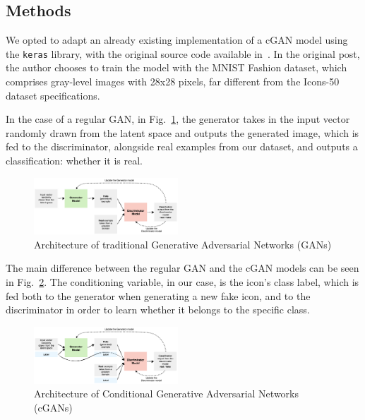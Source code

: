 \subsection{Methods}\label{subsec:methods}
We opted to adapt an already existing implementation of a cGAN model using the \texttt{keras} library, with the original source code available in~\cite{BrownleeCGAN, BrownleeGAN}.
In the original post, the author chooses to train the model with the MNIST Fashion dataset, which comprises gray-level images with 28x28 pixels, far different from the Icons-50 dataset specifications.

In the case of a regular GAN, in Fig.~\ref{fig:GANArch}, the generator takes in the input vector randomly drawn from the latent space and outputs the generated image, which is fed to the discriminator, alongside real examples from our dataset, and outputs a classification: whether it is real.

\begin{figure}[htbp]
    \centering
    \includegraphics[width=0.48\textwidth]{images/architecture/gan_arch}
    \caption{Architecture of traditional Generative Adversarial Networks (GANs)}
    \label{fig:GANArch}
\end{figure}

The main difference between the regular GAN and the cGAN models can be seen in Fig.~\ref{fig:cGANArch}.
The conditioning variable, in our case, is the icon's class label, which is fed both to the generator when generating a new fake icon, and to the discriminator in order to learn whether it belongs to the specific class.

\begin{figure}[htbp]
    \centering
    \includegraphics[width=0.48\textwidth]{images/architecture/cgan_arch}
    \caption{Architecture of Conditional Generative Adversarial Networks (cGANs)}
    \label{fig:cGANArch}
\end{figure}

